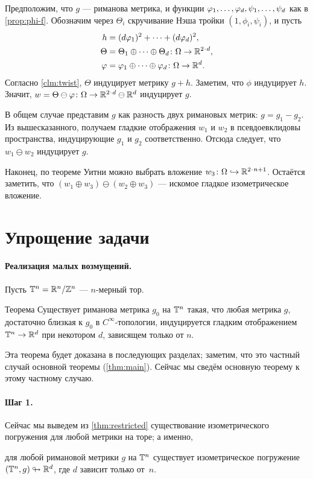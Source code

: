 Предположим, что $g$ --- риманова метрика, и функции $\phi_1,\z\dots,\phi_d,\psi_1,\z\dots,\psi_d$ как в \ref{prop:phi-f}.
Обозначим через $\Theta_i$ скручивание Нэша тройки $(1,\phi_i,\psi_i)$, и пусть
\begin{align*}
h&=(d\phi_1)^2+\dots+(d\phi_d)^2,
\\
\Theta&=\Theta_1\oplus\dots\oplus \Theta_d\colon\Omega\to \RR^{2\cdot d},
\\
\phi&=\phi_1\oplus \dots\oplus \phi_d\colon\Omega\to \RR^{d}.
\end{align*}
Согласно \ref{clm:twist}, $\Theta$ индуцирует метрику $g+h$.
Заметим, что $\phi$ индуцирует $h$.
Значит, $w=\Theta\ominus \phi\colon\Omega\to \RR^{2\cdot d}\ominus\RR^d$ индуцирует $g$.

В общем случае представим $g$ как разность двух римановых метрик: $g = g_1 - g_2$.
Из вышесказанного, получаем гладкие отображения $w_1$ и $w_2$ в псевдоевклидовы пространства, индуцирующие $g_1$ и $g_2$ соответственно.
Отсюда следует, что $w_1 \ominus w_2$ индуцирует $g$.

Наконец, по теореме Уитни можно выбрать вложение $w_3\colon\Omega\z\hookrightarrow \RR^{2\cdot n+1}$.
Остаётся заметить, что $(w_1 \oplus w_3)\ominus (w_2\oplus w_3)$ --- искомое гладкое изометрическое вложение.
\qeds

\section{Упрощение задачи}\label{sec:Reductions}

\paragraph{Реализация малых возмущений.}
Пусть $\mathbb{T}^n=\mathbb{R}^n/\mathbb{Z}^n$ --- $n$-мерный тор.

\begin{thm}{Теорема}\label{thm:restricted}
Существует риманова метрика $g_0$ на $\mathbb{T}^n$ такая, что
любая метрика $g$, достаточно близкая к $g_0$ в $C^\infty$-топологии, индуцируется гладким отображением $\mathbb{T}^n\to \mathbb{R}^d$ при некотором $d$, зависящем только от $n$.
\end{thm}

Эта теорема будет доказана в последующих разделах; заметим, что это частный случай основной теоремы (\ref{thm:main}).
Сейчас мы сведём основную теорему к этому частному случаю.

\paragraph{Шаг 1.}
Сейчас мы выведем из \ref{thm:restricted} существование изометрического погружения для любой метрики на торе; а именно,
\begin{clm}{}
для любой римановой метрики $g$ на $\mathbb{T}^n$ существует изометрическое погружение $(\mathbb{T}^n, g) \looparrowright \mathbb{R}^d$, где $d$ зависит только от~$n$.
\end{clm}

